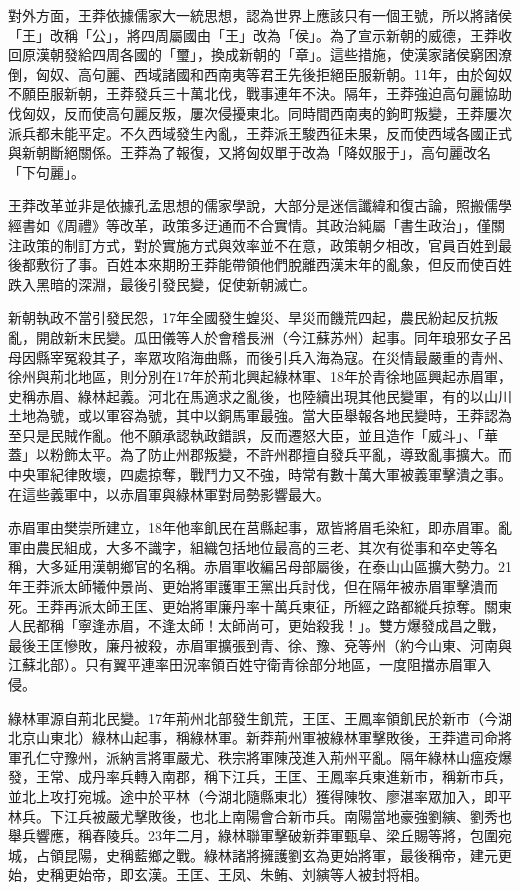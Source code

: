 對外方面，王莽依據儒家大一統思想，認為世界上應該只有一個王號，所以將諸侯「王」改稱「公」，將四周屬國由「王」改為「侯」。為了宣示新朝的威德，王莽收回原漢朝發給四周各國的「璽」，換成新朝的「章」。這些措施，使漢家諸侯窮困潦倒，匈奴、高句麗、西域諸國和西南夷等君王先後拒絕臣服新朝。11年，由於匈奴不願臣服新朝，王莽發兵三十萬北伐，戰事連年不決。隔年，王莽強迫高句麗協助伐匈奴，反而使高句麗反叛，屢次侵擾東北。同時間西南夷的鉤町叛變，王莽屢次派兵都未能平定。不久西域發生內亂，王莽派王駿西征未果，反而使西域各國正式與新朝斷絕關係。王莽為了報復，又將匈奴單于改為「降奴服于」，高句麗改名「下句麗」。

王莽改革並非是依據孔孟思想的儒家學說，大部分是迷信讖緯和復古論，照搬儒學經書如《周禮》等改革，政策多迂通而不合實情。其政治純屬「書生政治」，僅關注政策的制訂方式，對於實施方式與效率並不在意，政策朝夕相改，官員百姓到最後都敷衍了事。百姓本來期盼王莽能帶領他們脫離西漢末年的亂象，但反而使百姓跌入黑暗的深淵，最後引發民變，促使新朝滅亡。

新朝執政不當引發民怨，17年全國發生蝗災、旱災而饑荒四起，農民紛起反抗叛亂，開啟新末民變。瓜田儀等人於會稽長洲（今江蘇苏州）起事。同年琅邪女子呂母因縣宰冤殺其子，率眾攻陷海曲縣，而後引兵入海為寇。在災情最嚴重的青州、徐州與荊北地區，則分別在17年於荊北興起綠林軍、18年於青徐地區興起赤眉軍，史稱赤眉、綠林起義。河北在馬適求之亂後，也陸續出現其他民變軍，有的以山川土地為號，或以軍容為號，其中以銅馬軍最強。當大臣舉報各地民變時，王莽認為至只是民賊作亂。他不願承認執政錯誤，反而遷怒大臣，並且造作「威斗」、「華蓋」以粉飾太平。為了防止州郡叛變，不許州郡擅自發兵平亂，導致亂事擴大。而中央軍紀律敗壞，四處掠奪，戰鬥力又不強，時常有數十萬大軍被義軍擊潰之事。在這些義軍中，以赤眉軍與綠林軍對局勢影響最大。

赤眉軍由樊崇所建立，18年他率飢民在莒縣起事，眾皆將眉毛染紅，即赤眉軍。亂軍由農民組成，大多不識字，組織包括地位最高的三老、其次有從事和卒史等名稱，大多延用漢朝鄉官的名稱。赤眉軍收編呂母部屬後，在泰山山區擴大勢力。21年王莽派太師犧仲景尚、更始將軍護軍王黨出兵討伐，但在隔年被赤眉軍擊潰而死。王莽再派太師王匡、更始將軍廉丹率十萬兵東征，所經之路都縱兵掠奪。關東人民都稱「寧逢赤眉，不逢太師！太師尚可，更始殺我！」。雙方爆發成昌之戰，最後王匡慘敗，廉丹被殺，赤眉軍擴張到青、徐、豫、兗等州（約今山東、河南與江蘇北部）。只有翼平連率田況率領百姓守衛青徐部分地區，一度阻擋赤眉軍入侵。

綠林軍源自荊北民變。17年荊州北部發生飢荒，王匡、王鳳率領飢民於新市（今湖北京山東北）綠林山起事，稱綠林軍。新莽荊州軍被綠林軍擊敗後，王莽遣司命將軍孔仁守豫州，派納言將軍嚴尤、秩宗將軍陳茂進入荊州平亂。隔年綠林山瘟疫爆發，王常、成丹率兵轉入南郡，稱下江兵，王匡、王鳳率兵東進新市，稱新市兵，並北上攻打宛城。途中於平林（今湖北隨縣東北）獲得陳牧、廖湛率眾加入，即平林兵。下江兵被嚴尤擊敗後，也北上南陽會合新市兵。南陽當地豪強劉縯、劉秀也舉兵響應，稱舂陵兵。23年二月，綠林聯軍擊破新莽軍甄阜、梁丘賜等將，包圍宛城，占領昆陽，史稱藍鄉之戰。綠林諸將擁護劉玄為更始將軍，最後稱帝，建元更始，史稱更始帝，即玄漢。王匡、王凤、朱鲔、刘縯等人被封将相。

